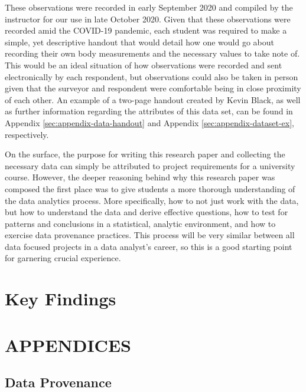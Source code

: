 \documentclass[]{article}
\begin{document}
\vspace{0.25cm}

These observations were recorded in early September 2020 and compiled by
the instructor for our use in late October 2020. Given that these
observations were recorded amid the COVID-19 pandemic, each student was
required to make a simple, yet descriptive handout that would detail how
one would go about recording their own body measurements and the
necessary values to take note of. This would be an ideal situation of
how observations were recorded and sent electronically by each
respondent, but observations could also be taken in person given that
the surveyor and respondent were comfortable being in close proximity of
each other. An example of a two-page handout created by Kevin Black, as
well as further information regarding the attributes of this data set,
can be found in Appendix \ref{sec:appendix-data-handout} and Appendix
\ref{sec:appendix-dataset-ex}, respectively.

\vspace{0.25cm}

On the surface, the purpose for writing this research paper and
collecting the necessary data can simply be attributed to project
requirements for a university course. However, the deeper reasoning
behind why this research paper was composed the first place was to give
students a more thorough understanding of the data analytics process.
More specifically, how to not just work with the data, but how to
understand the data and derive effective questions, how to test for
patterns and conclusions in a statistical, analytic environment, and how
to exercise data provenance practices. This process will be very similar
between all data focused projects in a data analyst's career, so this is
a good starting point for garnering crucial experience.

\section{Key Findings}
\label{sec:findings}

\newpage

\section{APPENDICES}
\label{sec:appendix}

\subsection{Data Provenance}
\label{sec:appendix-data-provenance}
\end{document}
